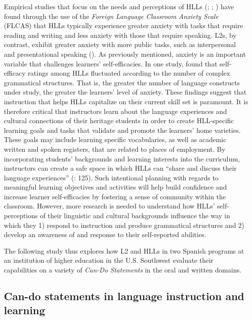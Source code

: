 \documentclass[output=paper]{langscibook}
\begin{document}
Empirical studies that focus on the needs and perceptions of HLLs (\citealt{HedgcockLefkowitz2016}; \citealt{TorresTurner2015}; \citealt{Tallon2009}) have found through the use of the \textit{Foreign Language Classroom Anxiety Scale} (FLCAS) that HLLs typically experience greater anxiety with tasks that require reading and writing and less anxiety with those that require speaking. L2s, by contrast, exhibit greater anxiety with more public tasks, such as interpersonal and presentational speaking (\citealt{MacIntyreClément1997}). As previously mentioned, anxiety is an important variable that challenges learners’ self-efficacies. In one study, \citet{Tallon2009} found that self-efficacy ratings among HLLs fluctuated according to the number of complex grammatical structures. That is, the greater the number of language constructs under study, the greater the learners’ level of anxiety. These findings suggest that instruction that helps HLLs capitalize on their current skill set is paramount. It is therefore critical that instructors learn about the language experiences and cultural connections of their heritage students in order to create HLL-specific learning goals and tasks that validate and promote the learners’ home varieties. These goals may include learning specific vocabularies, as well as academic written and spoken registers, that are related to places of employment. By incorporating students’ backgrounds and learning interests into the curriculum, instructors can create a safe space in which HLLs can “share and discuss their language experiences” (\citeyear{Tallon2009}: 125).  Such intentional planning with regards to meaningful learning objectives and activities will help build confidence and increase learner self-efficacies by fostering a sense of community within the classroom. However, more research is needed to understand how HLLs’ self-perceptions of their linguistic and cultural backgrounds influence the way in which they 1) respond to instruction and produce grammatical structures and 2) develop an awareness of and response to their self-reported abilities.

The following study thus explores how L2 and HLLs in two Spanish programs at an institution of higher education in the U.S. Southwest evaluate their capabilities on a variety of  \textit{Can-Do Statements} in the oral and written domains.


\subsection{Can-do statements in language instruction and learning}
\end{document}
